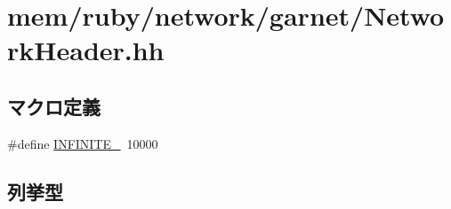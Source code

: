 \hypertarget{NetworkHeader_8hh}{
\section{mem/ruby/network/garnet/NetworkHeader.hh}
\label{NetworkHeader_8hh}
}
\subsection*{マクロ定義}
\begin{DoxyCompactItemize}
\item 
\#define \hyperlink{NetworkHeader_8hh_aac76a431309c71d2b2fca34b5a9896ba}{INFINITE\_\-}~10000
\end{DoxyCompactItemize}
\subsection*{列挙型}
